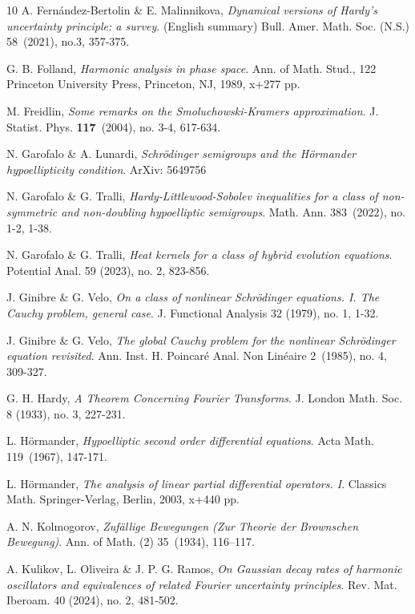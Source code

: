 \documentclass[11pt,a4paper]{amsart}
\numberwithin{equation}{section}
\numberwithin{equation}{section}
\begin{document}
\begin{thebibliography}{10}
A. Fern\'andez-Bertolin \& E. Malinnikova, 
\emph{Dynamical versions of Hardy's uncertainty principle: a survey}. (English summary)
Bull. Amer. Math. Soc. (N.S.) 58~(2021), no.3, 357-375.


G. B. Folland, \emph{Harmonic analysis in phase space}.
Ann. of Math. Stud., 122
Princeton University Press, Princeton, NJ, 1989, x+277 pp.

M. Freidlin, \emph{Some remarks on the Smoluchowski-Kramers approximation}. J. Statist. Phys. \textbf{117}~(2004), no. 3-4, 617-634.

N. Garofalo \& A. Lunardi, \emph{Schr\"odinger semigroups and the H\"ormander hypoellipticity condition}. ArXiv: 5649756



N. Garofalo \& G. Tralli, \emph{Hardy-Littlewood-Sobolev inequalities for a class of non-symmetric and non-doubling hypoelliptic semigroups}.
Math. Ann. 383~(2022), no. 1-2, 1-38.

N. Garofalo \& G. Tralli, \emph{Heat kernels for a class of hybrid evolution equations}.
Potential Anal. 59 (2023), no. 2, 823-856.

J. Ginibre \& G. Velo, \emph{On a class of nonlinear Schr\"odinger equations. I. The Cauchy problem, general case}.
J. Functional Analysis 32 (1979), no. 1, 1-32.

J. Ginibre \& G. Velo, \emph{The global Cauchy problem for the nonlinear Schr\"odinger equation revisited}.
Ann. Inst. H. Poincar\'e Anal. Non Lin\'eaire 2~(1985), no. 4, 309-327.



G. H. Hardy, \emph{A Theorem Concerning Fourier Transforms}.
J. London Math. Soc. 8 (1933), no. 3, 227-231.

L. H{\"o}rmander,
\textit{Hypoelliptic second order differential equations}. Acta Math. 119~(1967), 147-171.

L. H{\"o}rmander,
\textit{The analysis of linear partial differential operators. I}.
Classics Math.
Springer-Verlag, Berlin, 2003, x+440 pp.

A. N. Kolmogorov,  
\textit{Zuf\"allige Bewegungen (Zur Theorie der Brownschen Bewegung)}. Ann. of Math. (2) 35~(1934), 116--117.




A. Kulikov, L. Oliveira \& J. P. G. Ramos, \emph{On Gaussian decay rates of harmonic oscillators and equivalences of related Fourier uncertainty principles}.
Rev. Mat. Iberoam. 40 (2024), no. 2, 481-502.


\end{thebibliography}
\end{document}
